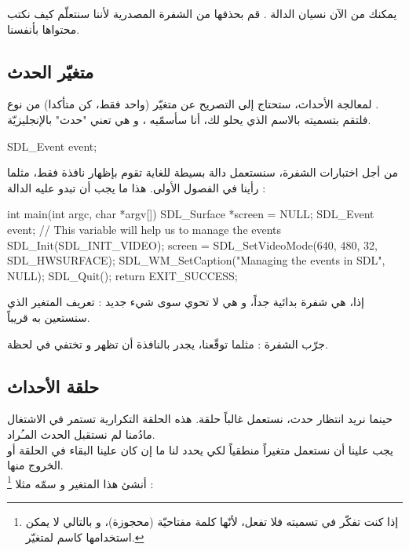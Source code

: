 \begin{information}
يمكنك من الآن نسيان الدالة
.
قم بحذفها من الشفرة المصدرية لأننا سنتعلّم كيف نكتب محتواها بأنفسنا.
\end{information}

\subsection{متغيّر الحدث}

لمعالجة الأحداث، ستحتاج إلى التصريح عن متغيّر (واحد فقط، كن متأكدا) من نوع 
.\\
فلتقم بتسميته بالاسم الذي يحلو لك، أنا سأسمّيه 
،
و هي تعني "حدث" بالإنجليزيّة.

\begin{Csource}
SDL_Event event;
\end{Csource}

من أجل اختبارات الشفرة، سنستعمل دالة
بسيطة للغاية تقوم بإظهار نافذة فقط، مثلما رأينا في الفصول الأولى. هذا ما يجب أن تبدو عليه الدالة
 :

\begin{Csource}
int main(int argc, char *argv[])
{
	SDL_Surface *screen = NULL;
	SDL_Event event; // This variable will help us to manage the events
	SDL_Init(SDL_INIT_VIDEO);
	screen = SDL_SetVideoMode(640, 480, 32, SDL_HWSURFACE);
	SDL_WM_SetCaption("Managing the events in SDL", NULL);
	SDL_Quit();
	return EXIT_SUCCESS;
}
\end{Csource}

إذا، هي شفرة بدائية جداً، و هي لا تحوي سوى شيء جديد : تعريف المتغير
الذي سنستعين به قريباً.

جرّب الشفرة : مثلما توقّعنا، يجدر بالنافذة أن تظهر و تختفي في لحظة.

\subsection{حلقة الأحداث}

حينما نريد انتظار حدث، نستعمل غالباً حلقة. هذه الحلقة التكرارية تستمر في الاشتغال مادُمنا لم نستقبل الحدث المـُراد.\\
يجب علينا أن نستعمل متغيراً منطقياً لكي يحدد لنا ما إن كان علينا البقاء في الحلقة أو الخروج منها.\\
أنشئ هذا المتغير و سمّه مثلا
\footnote{
إذا كنت تفكّر في تسميته
فلا تفعل، لأنّها كلمة مفتاحيّة (محجوزة)، و بالتالي لا يمكن استخدامها كاسم لمتغيّر.} :

